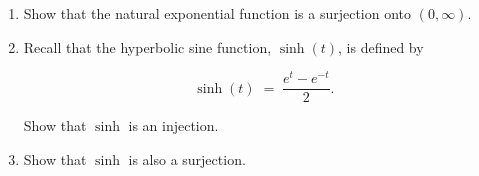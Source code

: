 \documentclass{amsart}
\begin{document}
\begin{enumerate}
\vfill

\item Show that the natural exponential function is a surjection onto $(0, \infty)$.

\vfill

\newpage

\item Recall that the hyperbolic sine function, $\sinh{(t)}$, is defined by 

\[ \sinh{(t)} \; = \; \frac{e^t - e^{-t}}{2}. \]

Show that $\sinh{}$ is an injection.

\vfill

\item Show that $\sinh{}$ is also a surjection.

\vfill


\end{enumerate}
\end{document}
